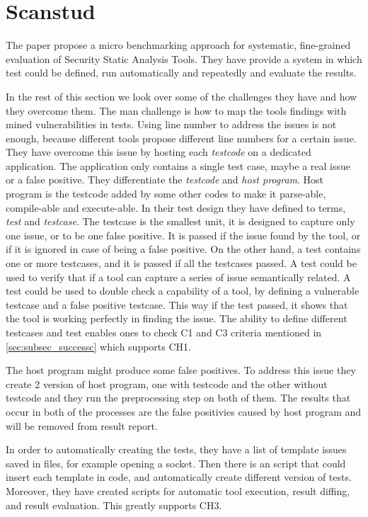 \documentclass[authoryear,preprint]{sigplanconf}
\begin{document}
\section{Scanstud}
\label{sec:sec_scanstud}
The paper propose a micro benchmarking approach for systematic, fine-grained evaluation of Security Static Analysis Tools. They have provide a system in which test could be defined, run automatically and repeatedly and evaluate the results. 

In the rest of this section we look over some of the challenges they have and how they overcome them. The man challenge is how to map the tools findings with mined vulnerabilities in tests. Using line number to address the issues is not enough, because different tools propose different line numbers for a certain issue. They have overcome this issue by hosting each \textit{testcode} on a dedicated application. The application only contains a single test case, maybe a real issue or a false positive. They differentiate the \textit{testcode} and \textit{host program}. Host program is the testcode added by some other codes to make it parse-able, compile-able and execute-able. In their test design they have defined to terms, \textit{test} and \textit{testcase}. The testcase is the smallest unit, it is designed to capture only one issue, or to be one false positive. It is passed if the issue found by the tool, or if it is ignored in case of being a false positive. On the other hand, a test contains one or more testcases, and it is passed if all the testcases passed. A test could be used to verify that if a tool can capture a series of issue semantically related. A test could be used to double check a capability of a tool, by defining a vulnerable testcase and a false positive testcase. This way if the test passed, it shows that the tool is working perfectly in finding the issue. The ability to define different testcases and test enables ones to check C1 and C3 criteria mentioned in \ref{sec:subsec_successc} which supports CH1.

The host program might produce some false positives. To address this issue they create 2 version of host program, one with testcode and the other without testcode and they run the preprocessing step on both of them. The results that occur in both of the processes are the false positivies caused by host program and will be removed from result report. 

In order to automatically creating the tests, they have a list of template issues saved in files, for example opening a socket. Then there is an script that could insert each template in code, and automatically create different version of tests. Moreover, they have created scripts for automatic tool execution, result diffing, and result evaluation. This greatly supports CH3.
\end{document}
